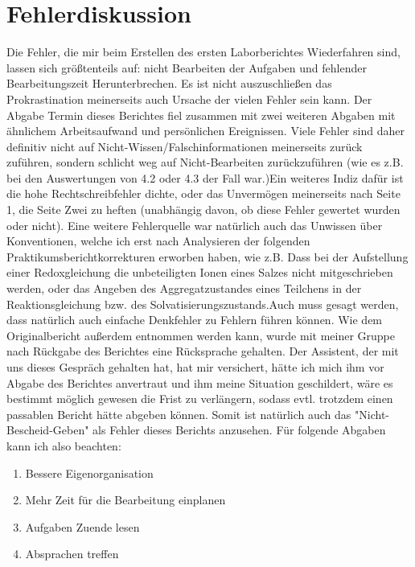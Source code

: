 \documentclass[A4paper, 11p]{article}
\begin{document}
\section{Fehlerdiskussion}
Die Fehler, die mir beim Erstellen des ersten Laborberichtes Wiederfahren sind, lassen sich größtenteils auf: nicht Bearbeiten der Aufgaben und fehlender Bearbeitungszeit Herunterbrechen. Es ist nicht auszuschließen das Prokrastination meinerseits auch Ursache der vielen Fehler sein kann. Der Abgabe Termin dieses Berichtes fiel zusammen mit zwei weiteren Abgaben mit ähnlichem Arbeitsaufwand und persönlichen Ereignissen. Viele Fehler sind daher definitiv nicht auf Nicht-Wissen/Falschinformationen meinerseits zurück zuführen, sondern schlicht weg auf Nicht-Bearbeiten zurückzuführen (wie es z.B. bei den Auswertungen von 4.2 oder 4.3 der Fall war.)Ein weiteres Indiz dafür ist die hohe Rechtschreibfehler dichte, oder das Unvermögen meinerseits nach Seite 1, die Seite Zwei zu heften (unabhängig davon, ob diese Fehler gewertet wurden oder nicht). Eine weitere Fehlerquelle war natürlich auch das Unwissen über Konventionen, welche ich erst nach Analysieren der folgenden Praktikumsberichtkorrekturen erworben haben, wie z.B. Dass bei der Aufstellung einer Redoxgleichung die unbeteiligten Ionen eines Salzes nicht mitgeschrieben werden, oder das Angeben des Aggregatzustandes eines Teilchens in der Reaktionsgleichung bzw. des Solvatisierungszustands.Auch muss gesagt werden, dass natürlich auch einfache Denkfehler zu Fehlern führen können. Wie dem Originalbericht außerdem entnommen werden kann, wurde mit meiner Gruppe nach Rückgabe des Berichtes eine Rücksprache gehalten. Der Assistent, der mit uns dieses Gespräch gehalten hat, hat mir versichert, hätte ich mich ihm vor Abgabe des Berichtes anvertraut und ihm meine Situation geschildert, wäre es bestimmt möglich gewesen die Frist zu verlängern, sodass evtl. trotzdem einen passablen Bericht hätte abgeben können. Somit ist natürlich auch das "Nicht-Bescheid-Geben" als Fehler dieses Berichts anzusehen. Für folgende Abgaben kann ich also beachten:
\begin{enumerate}
\item Bessere Eigenorganisation
\item Mehr Zeit für die Bearbeitung einplanen
\item Aufgaben Zuende lesen
\item Absprachen treffen
\end{enumerate}
\end{document}
